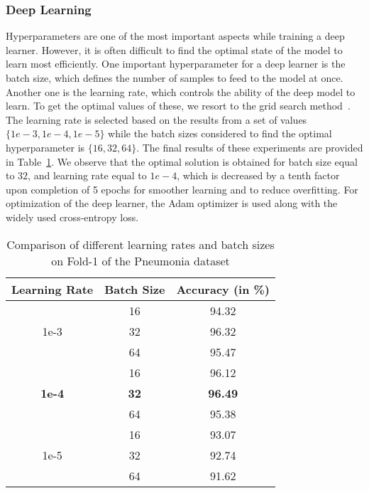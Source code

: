 \documentclass[final,3p,times]{elsarticle}
\begin{document}
\subsubsection{Deep Learning}
Hyperparameters are one of the most {important aspects while training} a deep learner. However, it is often difficult to find the optimal state of the model to learn most efficiently. One {important} hyperparameter for a deep learner is the batch size, which defines the number of samples to {feed} to the model at {once.} Another one is the learning rate, which controls the ability of the deep model to learn. {To get the optimal values} of these, we resort to the grid search method~\cite{paul2022ensemble}. The learning rate is selected based on the results from {a} set of values $\{1e-3,1e-4,1e-5\}$ while the batch sizes considered to find the optimal hyperparameter is $\{16,32,64\}$. The final results of these experiments are provided in Table~\ref{tab:hyper}. We observe that the optimal solution is obtained for batch size equal to $32$, and learning rate equal to $1e-4$, which is decreased by a tenth factor upon completion of 5 epochs for smoother learning and to reduce overfitting. For optimization of the deep learner, the Adam optimizer is used along with the widely used cross-entropy loss.
\begin{table}[ht!]
    \centering
    \caption{Comparison of different learning rates and batch sizes on Fold-1 of the Pneumonia dataset}
    \begin{tabular}{c|c|c}
         \toprule
         Learning Rate & Batch Size & Accuracy (in \%)\\
         \midrule
         \multirow{3}{*}{1e-3} & 16 & 94.32\\
         & 32 & 96.32\\
         & 64 & 95.47\\
         \midrule
         \multirow{3}{*}{\textbf{1e-4}} & 16 & 96.12\\
         & \textbf{32} & \textbf{96.49}\\
         & 64 & 95.38\\
         \midrule
         \multirow{3}{*}{1e-5} & 16 & 93.07\\
         & 32 & 92.74\\
         & 64 & 91.62\\
         \bottomrule
    \end{tabular}
    
    \label{tab:hyper}
\end{table}
\end{document}
